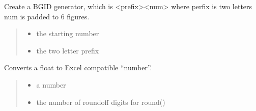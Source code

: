 \documentclass[letterpaper,12pt,english]{sphinxmanual}
\begin{document}
\begin{fulllineitems}

\pysigstartsignatures
\pysiglinewithargsret
{}
{\sphinxparamcomma {}}
{}
\pysigstopsignatures
\sphinxAtStartPar
Create a BGID generator, which is \textless{}prefix\textgreater{}\textless{}num\textgreater{} where perfix is two letters num is padded to 6 figures.
\begin{quote}\begin{description}
\begin{itemize}
\item {} 
\sphinxAtStartPar
{} \textendash{} the starting number

\item {} 
\sphinxAtStartPar
{} \textendash{} the two letter prefix

\end{itemize}

\end{description}\end{quote}

\end{fulllineitems}



\begin{fulllineitems}

\pysigstartsignatures
\pysiglinewithargsret
{}
{\sphinxparamcomma {}}
{}
\pysigstopsignatures
\sphinxAtStartPar
Converts a float to Excel compatible “number”.
\begin{quote}\begin{description}
\begin{itemize}
\item {} 
\sphinxAtStartPar
{} \textendash{} a number

\item {} 
\sphinxAtStartPar
{} \textendash{} the number of roundoff digits for round()

\end{itemize}

\end{description}\end{quote}

\end{fulllineitems}
\end{document}
